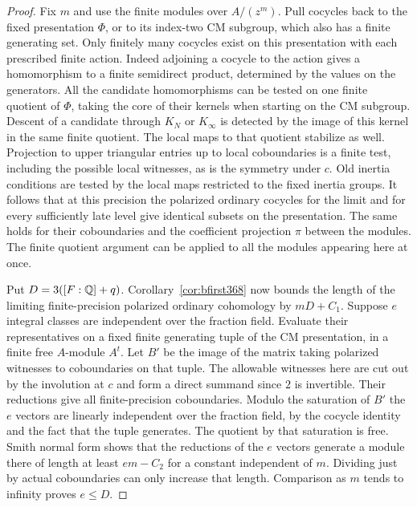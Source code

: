 \documentclass[a4paper,11pt]{article}
\theoremstyle{definition}
\theoremstyle{remark}
\numberwithin{equation}{section}
\begin{document}
\begin{proof}
Fix \(m\) and use the finite modules over \(A/(z^m)\). Pull
cocycles back to the fixed presentation \(\Phi\), or to its
index-two CM subgroup, which also has a finite generating
set. Only finitely many cocycles exist on this presentation
with each prescribed finite action. Indeed adjoining a
cocycle to the action gives a homomorphism to a finite
semidirect product, determined by the values on the
generators. All the candidate homomorphisms can be tested on
one finite quotient of \(\Phi\), taking the core of their
kernels when starting on the CM subgroup. Descent of a
candidate through \(K_N\) or \(K_\infty\) is detected by the
image of this kernel in the same finite quotient. The local
maps to that quotient stabilize as well. Projection to upper
triangular entries up to local coboundaries is a finite test,
including the possible local witnesses, as is the symmetry
under \(c\). Old inertia conditions are tested by the local
maps restricted to the fixed inertia groups. It follows
that at this precision the polarized ordinary cocycles for
the limit and for every sufficiently late level give
identical subsets on the presentation. The same holds for
their coboundaries and the coefficient projection \(\pi\)
between the modules. The finite quotient argument can be
applied to all the modules appearing here at once.

Put \(D=3([F:\mathbb Q]+q)\). Corollary~\ref{cor:bfirst368} now
bounds the length of the limiting finite-precision polarized
ordinary cohomology by \(mD+C_1\). Suppose \(e\) integral
classes are independent over the fraction field. Evaluate
their representatives on a fixed finite generating tuple
of the CM presentation, in a finite free \(A\)-module
\(A^t\). Let \(B'\) be the image of the matrix taking
polarized witnesses to coboundaries on that tuple.
The allowable witnesses here are cut out by the involution
at \(c\) and form a direct summand since \(2\) is invertible.
Their reductions give all finite-precision coboundaries.
Modulo the saturation of \(B'\) the \(e\) vectors are
linearly independent over the fraction field, by the
cocycle identity and the fact that the tuple generates.
The quotient by that saturation is free. Smith normal
form shows that the reductions of the \(e\) vectors generate
a module there of length at least \(em-C_2\) for a constant
independent of \(m\). Dividing just by actual coboundaries
can only increase that length. Comparison as \(m\) tends
to infinity proves \(e\le D\).


\end{proof}
\end{document}
